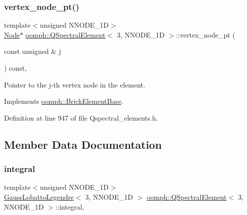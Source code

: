 \subsubsection{\texorpdfstring{vertex\+\_\+node\+\_\+pt()}{vertex\_node\_pt()}}
{\footnotesize\ttfamily template$<$unsigned N\+N\+O\+D\+E\+\_\+1D$>$ \\
\hyperlink{classoomph_1_1Node}{Node}$\ast$ \hyperlink{classoomph_1_1QSpectralElement}{oomph\+::\+Q\+Spectral\+Element}$<$ 3, N\+N\+O\+D\+E\+\_\+1D $>$\+::vertex\+\_\+node\+\_\+pt (\begin{DoxyParamCaption}\item[{const unsigned \&}]{j }\end{DoxyParamCaption}) const\hspace{0.3cm}{\ttfamily [inline]}, {\ttfamily [virtual]}}



Pointer to the j-\/th vertex node in the element. 



Implements \hyperlink{classoomph_1_1BrickElementBase_a3b12dfa7761de6719dd66776488b3bf1}{oomph\+::\+Brick\+Element\+Base}.



Definition at line 947 of file Qspectral\+\_\+elements.\+h.



\subsection{Member Data Documentation}
\mbox{\label{classoomph_1_1QSpectralElement_3_013_00_01NNODE__1D_01_4_a90bf1c3ae2ebd7b1cb81d5fa0370c532}} 
\subsubsection{\texorpdfstring{integral}{integral}}
{\footnotesize\ttfamily template$<$unsigned N\+N\+O\+D\+E\+\_\+1D$>$ \\
\hyperlink{classoomph_1_1GaussLobattoLegendre}{Gauss\+Lobatto\+Legendre}$<$ 3, N\+N\+O\+D\+E\+\_\+1D $>$ \hyperlink{classoomph_1_1QSpectralElement}{oomph\+::\+Q\+Spectral\+Element}$<$ 3, N\+N\+O\+D\+E\+\_\+1D $>$\+::integral\hspace{0.3cm}{\ttfamily [static]}, {\ttfamily [private]}}



